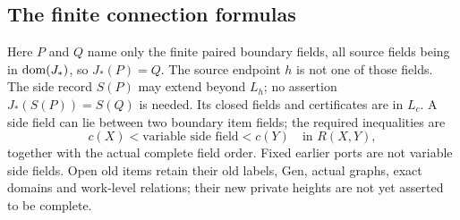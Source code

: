 \subsection{The finite connection formulas}\label{sec:connections}
Here $P$ and $Q$ name only the finite paired boundary fields, all source
fields being in $\operatorname{dom}(J_*)$, so $J_*(P)=Q$. The source endpoint $h$
is not one of those fields. The side record $S(P)$ may extend beyond
$L_h$; no assertion $J_*(S(P))=S(Q)$ is needed. Its closed fields and
certificates are in $L_c$. A side field can lie between two boundary
item fields; the required inequalities are
\begin{equation}\label{eq:7-2}
 c(X)<\text{variable side field}<c(Y)\quad\text{in }R(X,Y),
\end{equation}
together with the actual complete field order. Fixed earlier ports
are not variable side fields. Open old items retain their old labels,
Gen, actual graphs, exact domains and work-level relations; their new
private heights are not yet asserted to be complete.

